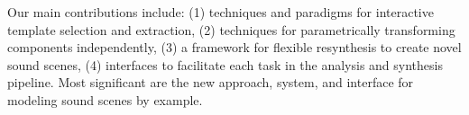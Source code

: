 \documentclass{acmsiggraph}               %
\begin{document}
Our main contributions include: (1) techniques and paradigms 
for interactive template selection and extraction, (2) techniques for 
parametrically transforming components independently, (3) a framework for 
flexible resynthesis to create novel sound scenes, (4) interfaces 
to facilitate each task in the analysis and synthesis pipeline. 
Most significant are the new  
approach, system, and interface for modeling sound scenes by example.



\nocite{*}

\end{document}
